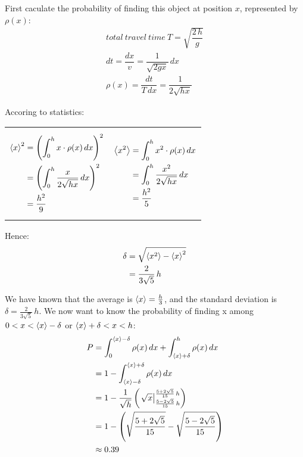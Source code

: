 {\color{hwSolution}
    First caculate the probability of finding this object at position $x$, represented by $\rho(x)$:
    \begin{align*}
        total~travel~time~T=\sqrt{\dfrac{2\,h}{g}}\\
        dt = \dfrac{dx}{v} = \dfrac{1}{\sqrt{2gx}}\,dx\\
        \rho(x) = \dfrac{dt}{T\,dx} = \dfrac{1}{2\sqrt{hx}}
    \end{align*}

    Accoring to statistics:

    \begin{tabularx}{\linewidth}{X|X}
        {\begin{align*}
        \left<x\right>^2   &= \left(\int_0^h x\cdot\rho(x)\,dx\right)^2\\
        &= \left(\int_0^h \dfrac{x}{2\sqrt{hx}}\,dx\right)^2\\
        &= \dfrac{h^2}{9}\\
        \end{align*}}
        &
        {\begin{align*}
        \left<x^2\right>   &= \int_0^h x^2\cdot\rho(x)\,dx\\
        &= \int_0^h \dfrac{x^2}{2\sqrt{hx}}\,dx\\
        &= \dfrac{h^2}{5}
        \end{align*}}
    \end{tabularx}

    Hence:
    \begin{align*}
        \delta  &= \sqrt{\left<x^2\right> - \left<x\right>^2}\\
                &= \dfrac{2}{3\sqrt{5}}\,h
    \end{align*}
}


{\color{hwSolution}
    We have known that the average is $\left<x\right>=\frac{h}{3}$, and the standard deviation is $\delta=\frac{2}{3\sqrt{5}}\,h$. We now want to know the probability of finding x among $0<x<\left<x\right>-\delta$ or $\left<x\right>+\delta < x < h$:
    \begin{align*}
        P   &= \int_0^{\left<x\right>-\delta} \rho(x)\,dx + \int_{\left<x\right>+\delta}^h \rho(x)\,dx\\
            &= 1 - \int_{\left<x\right>-\delta}^{\left<x\right>+\delta} \rho(x)\,dx\\
            &= 1 - \dfrac{1}{\sqrt{h}}\left(
                \left. \sqrt{x}\right|_{\frac{5-2\sqrt{5}}{15}\,h}^{\frac{5+2\sqrt{5}}{15}\,h}
            \right)\\
            &= 1 - \left(\sqrt{\dfrac{5+2\sqrt{5}}{15}}-\sqrt{\dfrac{5-2\sqrt{5}}{15}}\right)\\
            &\approx 0.39
    \end{align*}
}

